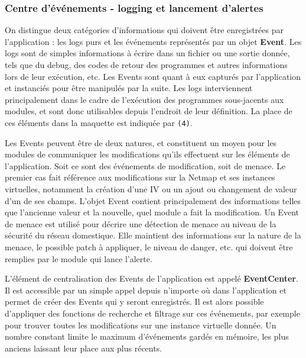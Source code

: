 \documentclass[]{article}
\begin{document}
\newpage

\subsubsection{Centre d’événements - logging et lancement d'alertes}

On distingue deux catégories d'informations qui doivent être enregistrées par l'application : les logs purs et les événements représentés par un objet \textbf{Event}. Les logs sont de simples informations à écrire dans un fichier ou une sortie donnée, tels que du debug, des codes de retour des programmes et autres informations lors de leur exécution, etc. Les Events sont quant à eux capturés par l'application et instanciés pour être manipulés par la suite. Les logs interviennent principalement dans le cadre de l'exécution des programmes sous-jacents aux modules, et sont donc utilisables depuis l'endroit de leur définition. La place de ces éléments dans la maquette est indiquée par \texttt{(4)}.\\

\par Les Events peuvent être de deux natures, et constituent un moyen pour les modules de communiquer les modifications qu'ils effectuent sur les éléments de l'application. Soit ce sont des événements de modification, soit de menace. Le premier cas fait référence aux modifications sur la Netmap et ses instances virtuelles, notamment la création d'une IV ou un ajout ou changement de valeur d'un de ses champs. L'objet Event contient principalement des informations telles que l'ancienne valeur et la nouvelle, quel module a fait la modification. Un Event de menace est utilisé pour décrire une détection de menace au niveau de la sécurité du réseau domestique. Elle maintient des informations sur la nature de la menace, le possible patch à appliquer, le niveau de danger, etc. qui doivent être remplies par le module qui lance l'alerte.\\

\par L'élément de centralisation des Events de l'application est appelé \textbf{EventCenter}. Il est accessible par un simple appel depuis n'importe où dans l'application et permet de créer des Events qui y seront enregistrés. Il est alors possible d'appliquer des fonctions de recherche et filtrage sur ces événements, par exemple pour trouver toutes les modifications sur une instance virtuelle donnée. Un nombre constant limite le maximum d'événements gardés en mémoire, les plus anciens laissant leur place aux plus récents.\\
\end{document}
